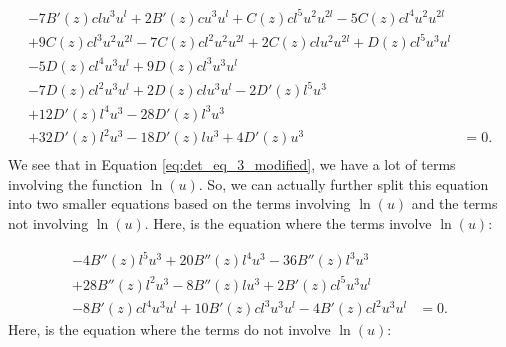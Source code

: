 \begin{equation}
\begin{split}
    - 7 B'(z) c l u^{3} u^{l} + 2 B'(z) c u^{3} u^{l} + C(z) c l^{5} u^{2} u^{2 l} - 5 C(z) c l^{4} u^{2} u^{2 l}&\\
    + 9 C(z) c l^{3} u^{2} u^{2 l} - 7 C(z) c l^{2} u^{2} u^{2 l} + 2 C(z) c l u^{2} u^{2 l} + D(z) c l^{5} u^{3} u^{l}&\\
    - 5 D(z) c l^{4} u^{3} u^{l} + 9 D(z) c l^{3} u^{3} u^{l}&\\
    - 7 D(z) c l^{2} u^{3} u^{l} + 2 D(z) c l u^{3} u^{l} - 2 D'(z) l^{5} u^{3}&\\
    + 12 D'(z) l^{4} u^{3} - 28 D'(z) l^{3} u^{3} &\\
    + 32 D'(z) l^{2} u^{3} - 18 D'(z) l u^{3} + 4 D'(z) u^{3}&=0.\\
  \end{split}
  \label{eq:det_eq_3_modified}
\end{equation}
We see that in Equation \eqref{eq:det_eq_3_modified}, we have a lot of terms involving the function $\ln(u)$. So, we can actually further split this equation into two smaller equations based on the terms involving $\ln(u)$ and the terms not involving $\ln(u)$. Here, is the equation where the terms involve $\ln(u)$:

\begin{equation}
  \begin{split}
    - 4 B''(z) l^{5} u^{3} + 20 B''(z) l^{4} u^{3} - 36 B''(z) l^{3} u^{3}&\\ + 28 B''(z) l^{2} u^{3} - 8 B''(z) l u^{3} + 2 B'(z) c l^{5} u^{3} u^{l} &\\
    - 8 B'(z) c l^{4} u^{3} u^{l} + 10 B'(z) c l^{3} u^{3} u^{l} - 4 B'(z) c l^{2} u^{3} u^{l}&=0.
    \end{split}
\end{equation}
Here, is the equation where the terms do not involve $\ln(u)$:

